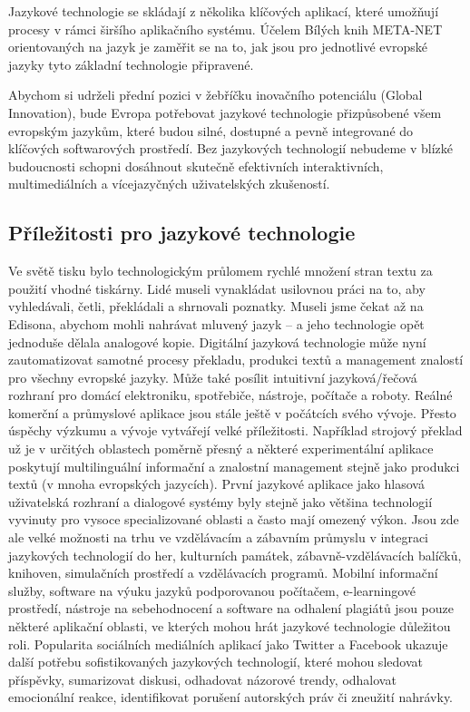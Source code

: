 \begin{multicols}{2}
Jazykové technologie se skládají z několika klíčových aplikací, které umožňují procesy v rámci širšího aplikačního systému. Účelem Bílých knih META-NET orientovaných na jazyk je zaměřit se na to, jak jsou pro jednotlivé evropské jazyky tyto základní technologie připravené.


Abychom si udrželi přední pozici v žebříčku inovačního potenciálu (Global Innovation), bude Evropa potřebovat jazykové technologie přizpůsobené všem evropským jazykům, které budou silné, dostupné a pevně integrované do klíčových softwarových prostředí. Bez jazykových technologií nebudeme v blízké budoucnosti schopni dosáhnout skutečně efektivních interaktivních, multimediálních a vícejazyčných uživatelských zkušeností.

\subsection{Příležitosti pro jazykové technologie}

Ve světě tisku bylo technologickým průlomem rychlé množení stran textu za použití vhodné tiskárny. Lidé museli vynakládat usilovnou práci na to, aby vyhledávali, četli, překládali a shrnovali poznatky. Museli jsme čekat až na Edisona, abychom mohli nahrávat mluvený jazyk – a jeho technologie opět jednoduše dělala analogové kopie.
Digitální jazyková technologie může nyní zautomatizovat samotné procesy překladu, produkci textů a management znalostí pro všechny evropské jazyky. Může také posílit intuitivní jazyková/řečová rozhraní pro domácí elektroniku, spotřebiče, nástroje, počítače a roboty. Reálné komerční a průmyslové aplikace jsou stále ještě v počátcích svého vývoje. Přesto úspěchy výzkumu a vývoje vytvářejí velké příležitosti. Například strojový překlad už je v určitých oblastech poměrně přesný a některé experimentální aplikace poskytují multilinguální informační a znalostní management stejně jako produkci textů (v mnoha evropských jazycích).
První jazykové aplikace jako hlasová uživatelská rozhraní a dialogové systémy byly stejně jako většina technologií vyvinuty pro vysoce specializované oblasti a často mají omezený výkon. Jsou zde ale velké možnosti na trhu ve vzdělávacím a zábavním průmyslu v integraci jazykových technologií do her, kulturních památek, zábavně-vzdělávacích balíčků, knihoven, simulačních prostředí a vzdělávacích programů. Mobilní informační služby, software na výuku jazyků podporovanou počítačem, e-learningové prostředí, nástroje na sebehodnocení a software na odhalení plagiátů jsou pouze některé aplikační oblasti, ve kterých mohou hrát jazykové technologie důležitou roli. Popularita sociálních mediálních aplikací jako Twitter a Facebook ukazuje další potřebu sofistikovaných jazykových technologií, které mohou sledovat příspěvky, sumarizovat diskusi, odhadovat názorové trendy, odhalovat emocionální reakce, identifikovat porušení autorských práv či zneužití nahrávky.


\end{multicols}
